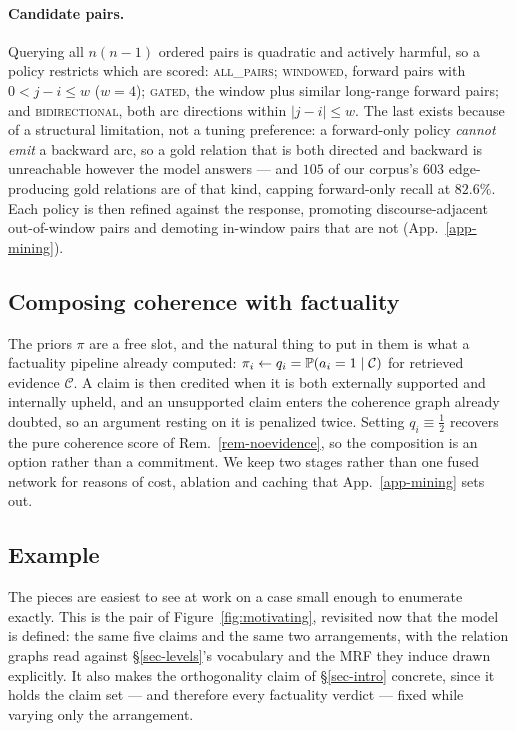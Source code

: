 \paragraph{Candidate pairs.} Querying all $n(n-1)$ ordered pairs is quadratic and actively harmful, so a
policy restricts which are scored: \textsc{all\_pairs}; \textsc{windowed}, forward pairs with $0<j-i\le w$
($w=4$); \textsc{gated}, the window plus similar long-range forward pairs; and \textsc{bidirectional}, both
arc directions within $|j-i|\le w$. The last exists because of a structural limitation, not a tuning
preference: a forward-only policy \emph{cannot emit} a backward arc, so a gold relation that is both directed
and backward is unreachable however the model answers --- and $105$ of our corpus's $603$ edge-producing gold
relations are of that kind, capping forward-only recall at $82.6\%$. Each policy is then refined against the
response, promoting discourse-adjacent out-of-window pairs and demoting in-window pairs that are not
(App.~\ref{app-mining}).

\subsection{Composing coherence with factuality}
\label{sec-twostage}

The priors $\pi$ are a free slot, and the natural thing to put in them is what a factuality pipeline already
computed: $\pi_i \leftarrow q_i = \mathbb{P}\!\left( a_i=1 \mid \mathcal{C} \right)$ for retrieved evidence $\mathcal{C}$. A claim is
then credited when it is both externally supported and internally upheld, and an unsupported claim enters the
coherence graph already doubted, so an argument resting on it is penalized twice. Setting $q_i\equiv\tfrac12$
recovers the pure coherence score of Rem.~\ref{rem-noevidence}, so the composition is an option rather than a
commitment. We keep two stages rather than one fused network for reasons of cost, ablation and caching that
App.~\ref{app-mining} sets out.

\subsection{Example}
\label{sec-example}

The pieces are easiest to see at work on a case small enough to enumerate exactly. This is the pair of
Figure~\ref{fig:motivating}, revisited now that the model is defined: the same five claims and the same two
arrangements, with the relation graphs read against \S\ref{sec-levels}'s vocabulary and the MRF they induce
drawn explicitly. It also makes the orthogonality claim of \S\ref{sec-intro} concrete, since it holds the
claim set --- and therefore every factuality verdict --- fixed while varying only the arrangement.

